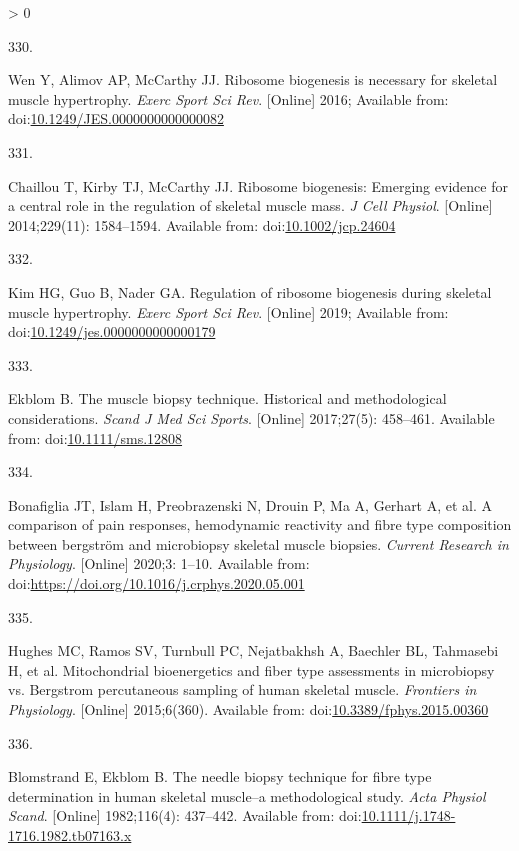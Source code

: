 \documentclass[twoside,10pt]{gihclass} %
\newlength{\cslhangindent}
\newlength{\csllabelwidth}
\newenvironment{CSLReferences}[3] %
 {%
  \setlength{\parindent}{0pt}
  \ifodd #1 \everypar{\setlength{\hangindent}{\cslhangindent}}\ignorespaces\fi
  \ifnum #2 > 0
  \setlength{\parskip}{#2\baselineskip}
  \fi
 }%
 {}
\newcommand{\CSLLeftMargin}[1]{\parbox[t]{\maxof{\widthof{#1}}{\csllabelwidth}}{#1}}
\newcommand{\CSLRightInline}[1]{\parbox[t]{\linewidth}{#1}}
\begin{document}
\begin{CSLReferences}{0}{0}
\leavevmode\hypertarget{ref-RN1757}{}%
\CSLLeftMargin{330. }
\CSLRightInline{Wen Y, Alimov AP, McCarthy JJ. Ribosome biogenesis is necessary for skeletal muscle hypertrophy. \emph{Exerc Sport Sci Rev}. {[}Online{]} 2016; Available from: doi:\href{https://doi.org/10.1249/JES.0000000000000082}{10.1249/JES.0000000000000082}}

\leavevmode\hypertarget{ref-RN1654}{}%
\CSLLeftMargin{331. }
\CSLRightInline{Chaillou T, Kirby TJ, McCarthy JJ. Ribosome biogenesis: Emerging evidence for a central role in the regulation of skeletal muscle mass. \emph{J Cell Physiol}. {[}Online{]} 2014;229(11): 1584--1594. Available from: doi:\href{https://doi.org/10.1002/jcp.24604}{10.1002/jcp.24604}}

\leavevmode\hypertarget{ref-RN2150}{}%
\CSLLeftMargin{332. }
\CSLRightInline{Kim HG, Guo B, Nader GA. Regulation of ribosome biogenesis during skeletal muscle hypertrophy. \emph{Exerc Sport Sci Rev}. {[}Online{]} 2019; Available from: doi:\href{https://doi.org/10.1249/jes.0000000000000179}{10.1249/jes.0000000000000179}}

\leavevmode\hypertarget{ref-RN2549}{}%
\CSLLeftMargin{333. }
\CSLRightInline{Ekblom B. The muscle biopsy technique. Historical and methodological considerations. \emph{Scand J Med Sci Sports}. {[}Online{]} 2017;27(5): 458--461. Available from: doi:\href{https://doi.org/10.1111/sms.12808}{10.1111/sms.12808}}

\leavevmode\hypertarget{ref-RN2553}{}%
\CSLLeftMargin{334. }
\CSLRightInline{Bonafiglia JT, Islam H, Preobrazenski N, Drouin P, Ma A, Gerhart A, et al. A comparison of pain responses, hemodynamic reactivity and fibre type composition between bergström and microbiopsy skeletal muscle biopsies. \emph{Current Research in Physiology}. {[}Online{]} 2020;3: 1--10. Available from: doi:\url{https://doi.org/10.1016/j.crphys.2020.05.001}}

\leavevmode\hypertarget{ref-RN2552}{}%
\CSLLeftMargin{335. }
\CSLRightInline{Hughes MC, Ramos SV, Turnbull PC, Nejatbakhsh A, Baechler BL, Tahmasebi H, et al. Mitochondrial bioenergetics and fiber type assessments in microbiopsy vs. Bergstrom percutaneous sampling of human skeletal muscle. \emph{Frontiers in Physiology}. {[}Online{]} 2015;6(360). Available from: doi:\href{https://doi.org/10.3389/fphys.2015.00360}{10.3389/fphys.2015.00360}}

\leavevmode\hypertarget{ref-RN874}{}%
\CSLLeftMargin{336. }
\CSLRightInline{Blomstrand E, Ekblom B. The needle biopsy technique for fibre type determination in human skeletal muscle--a methodological study. \emph{Acta Physiol Scand}. {[}Online{]} 1982;116(4): 437--442. Available from: doi:\href{https://doi.org/10.1111/j.1748-1716.1982.tb07163.x}{10.1111/j.1748-1716.1982.tb07163.x}}


\end{CSLReferences}
\end{document}
